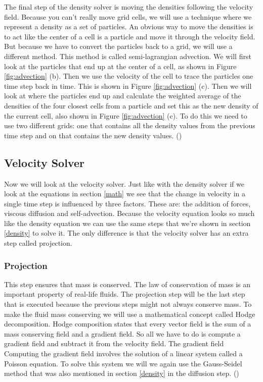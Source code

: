 \documentclass[a4paper,12pt,titlepage]{article}
\begin{document}
The final step of the density solver is moving the densities following the velocity field.
Because you can't really move grid cells, we will use a technique where we represent a density as a set of particles.
An obvious way to move the densities is to act like the center of a cell is a particle and move it through the velocity field.
But because we have to convert the particles back to a grid, we will use a different method. 
This method is called semi-lagrangian advection.
We will first look at the particles that end up at the center of a cell, as shown in Figure \ref{fig:advection} (b). Then we use the velocity of the cell to trace the particles one time step back in time. This is shown in Figure \ref{fig:advection} (c).
Then we will look at where the particles end up and calculate the weighted average of the densities of the four closest cells from a particle and set this as the new density of the current cell, also shown in Figure \ref{fig:advection} (c).
To do this we need to use two different grids: one that contains all the density values from the previous time step
and on that contains the new density values. (\cite{josstam})
 
\subsection{Velocity Solver} \label{velocity}
Now we will look at the velocity solver. Just like with the density solver if we look at the equations in section \ref{math}
we see that the change in velocity in a single time step is influenced by three factors. 
These are: the addition of forces, viscous diffusion and self-advection. 
Because the velocity equation looks so much like the density equation we can use the same steps that we're shown in section \ref{density} to solve it.
The only difference is that the velocity solver has an extra step called projection.

\subsubsection{Projection}
This step ensures that mass is conserved. 
The law of conservation of mass is an important property of real-life fluids.
The projection step will be the last step that is executed because the previous steps might not always conserve mass.
To make the fluid mass conserving we will use a mathematical concept called Hodge decomposition.
Hodge composition states that every vector field is the sum of a mass conserving field and a gradient field.
So all we have to do is compute a gradient field and subtract it from the velocity field. 
The gradient field 
Computing the gradient field involves the solution of a linear system called a Poisson equation.
To solve this system we will we again use the Gauss-Seidel method that was also mentioned in section \ref{density} in the diffusion step. (\cite{josstam})
\end{document}

